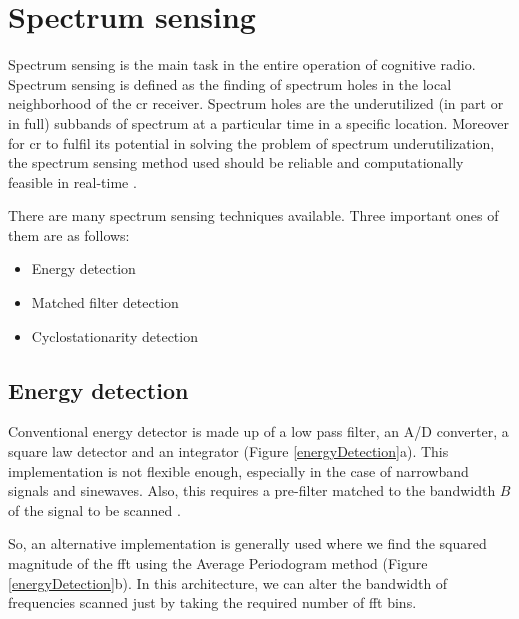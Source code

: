 \chapter{Spectrum sensing}

Spectrum sensing is the main task in the entire operation of cognitive
radio. Spectrum sensing is defined as the finding of spectrum holes in 
the local neighborhood of the \gls{cr} receiver. Spectrum holes are the
underutilized (in part or in full) subbands of spectrum at a particular time
in a specific location. Moreover for \gls{cr} to fulfil its potential
in solving the problem of spectrum underutilization, the spectrum sensing 
method used should be reliable and computationally feasible in real-time 
\cite{haykin09}.

There are many spectrum sensing techniques available. Three important ones of
them are as follows:
\begin{itemize}
    \item Energy detection
    \item Matched filter detection
    \item Cyclostationarity detection
\end{itemize}

\section{Energy detection}

Conventional energy detector is made up of a low pass filter, an A/D 
converter, a square law detector and an integrator (Figure 
\ref{energyDetection}a). This implementation is not flexible enough, 
especially in the case of narrowband signals and sinewaves. Also, this 
requires a pre-filter matched to the bandwidth $B$ of the signal to be scanned
\cite{cabric06}.

So, an alternative implementation is generally used where we find the squared 
magnitude of the \gls{fft}  using the Average Periodogram method (Figure 
\ref{energyDetection}b). In this architecture, we can alter the bandwidth of
frequencies scanned just by taking
the required number of \gls{fft}  bins. 

